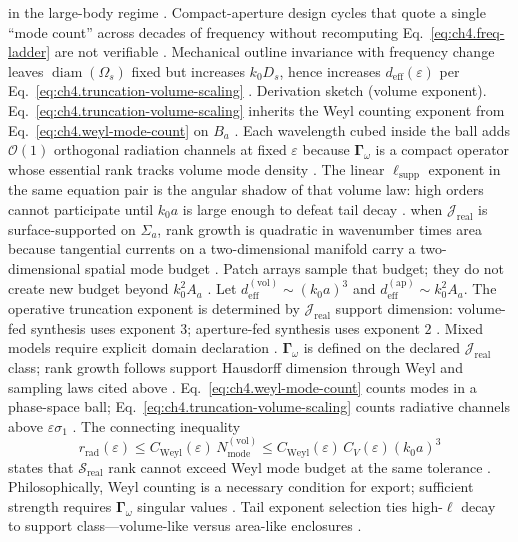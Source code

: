 in the large-body regime \cite{jackson1999}. Compact-aperture design cycles that quote a single ``mode count'' across decades of
frequency without recomputing Eq.~\eqref{eq:ch4.freq-ladder} are not verifiable \cite{stratton1941}.
\label{cor:ch4.outline-rank-noninvariant}
Mechanical outline invariance with frequency change leaves \(\operatorname{diam}(\Omega_{s})\) fixed but increases \(k_{0}D_{s}\), hence
increases \(d_{\mathrm{eff}}(\varepsilon)\) per Eq.~\eqref{eq:ch4.truncation-volume-scaling} \cite{jackson1999}.
Derivation sketch (volume exponent). Eq.~\eqref{eq:ch4.truncation-volume-scaling} inherits the Weyl counting exponent from Eq.~\eqref{eq:ch4.weyl-mode-count} on \(B_{a}\)
\cite{stratton1941}. Each wavelength cubed inside the ball adds \(\mathcal{O}(1)\) orthogonal radiation channels at fixed
\(\varepsilon\) because \(\boldsymbol{\Gamma}_\omega\) is a compact operator whose essential rank tracks volume mode density
\cite{hansen1988}. The linear \(\ell_{\mathrm{supp}}\) exponent in the same equation pair is the angular shadow of
that volume law: high orders cannot participate until \(k_{0}a\) is large enough to defeat tail decay \cite{jackson1999}.
when \(\mathcal{J}_{\mathrm{real}}\) is surface-supported on \(\Sigma_{a}\), rank growth is quadratic in wavenumber times area because
tangential currents on a two-dimensional manifold carry a two-dimensional spatial mode budget \cite{collin2001}.
Patch arrays sample that budget; they do not create new budget beyond \(k_{0}^{2}A_{a}\) \cite{hansen1988}.
\label{thm:ch4.exponent-selection}
Let \(d_{\mathrm{eff}}^{\mathrm{(vol)}}\sim(k_{0}a)^{3}\) and \(d_{\mathrm{eff}}^{\mathrm{(ap)}}\sim k_{0}^{2}A_{a}\). The operative
truncation exponent is determined by \(\mathcal{J}_{\mathrm{real}}\) support dimension: volume-fed synthesis uses exponent \(3\);
aperture-fed synthesis uses exponent \(2\) \cite{stratton1941}. Mixed models require explicit
domain declaration \cite{devaney2004}.
\(\boldsymbol{\Gamma}_\omega\) is defined on the declared \(\mathcal{J}_{\mathrm{real}}\) class; rank growth follows support Hausdorff
dimension through Weyl and sampling laws cited above \cite{stratton1941}.
Eq.~\eqref{eq:ch4.weyl-mode-count} counts modes in a phase-space ball; Eq.~\eqref{eq:ch4.truncation-volume-scaling} counts radiative channels
above \(\varepsilon\sigma_{1}\) \cite{stratton1941}. The connecting inequality
\begin{equation}
\label{eq:ch4.weyl-to-realizability}
r_{\mathrm{rad}}(\varepsilon)\le C_{\mathrm{Weyl}}(\varepsilon)\,N_{\mathrm{mode}}^{\mathrm{(vol)}}
\le
C_{\mathrm{Weyl}}(\varepsilon)\,C_{V}(\varepsilon)(k_{0}a)^{3}
\end{equation}
states that $\mathcal{S}_{\mathrm{real}}$ rank cannot exceed Weyl mode budget at the same tolerance \cite{harrington2001}. Philosophically,
Weyl counting is a necessary condition for export; sufficient strength requires \(\boldsymbol{\Gamma}_\omega\) singular values
\cite{hansen1988}.
Tail exponent selection ties high-$\ell$ decay to support class---volume-like versus area-like enclosures \cite{hansen1988}.
